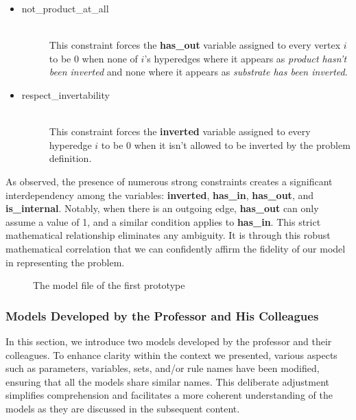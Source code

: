 \begin{enumerate}
\begin{itemize}
        \item 
        \begin{description}
            \item[not\_product\_at\_all] ~\\
            This constraint forces the \textbf{has\_out} variable assigned to every vertex $i$ to be 0 when none of $i$'s hyperedges where it appears as \emph{product hasn't been inverted} and none where it appears as \emph{substrate has been inverted}.
        \end{description}
        \item 
        \begin{description}
            \item[respect\_invertability] ~\\
            This constraint forces the \textbf{inverted} variable assigned to every hyperedge $i$ to be 0 when it isn't allowed to be inverted by the problem definition.
        \end{description}
    \end{itemize}
\end{enumerate} 

As observed, the presence of numerous strong constraints creates a significant interdependency among the variables: \textbf{inverted}, \textbf{has\_in}, \textbf{has\_out}, and \textbf{is\_internal}. Notably, when there is an outgoing edge, \textbf{has\_out} can only assume a value of 1, and a similar condition applies to \textbf{has\_in}. This strict mathematical relationship eliminates any ambiguity. It is through this robust mathematical correlation that we can confidently affirm the fidelity of our model in representing the problem.
    
    
\begin{figure}[H]
    \centering
    \caption{The model file of the first prototype}
    \label{fig:first-Prototype}
\end{figure}



\subsubsection{Models Developed by the Professor and His Colleagues} \label{sec:model_a_b}
In this section, we introduce two models developed by the professor and their colleagues. To enhance clarity within the context we presented, various aspects such as parameters, variables, sets, and/or rule names have been modified, ensuring that all the models share similar names. This deliberate adjustment simplifies comprehension and facilitates a more coherent understanding of the models as they are discussed in the subsequent content.

